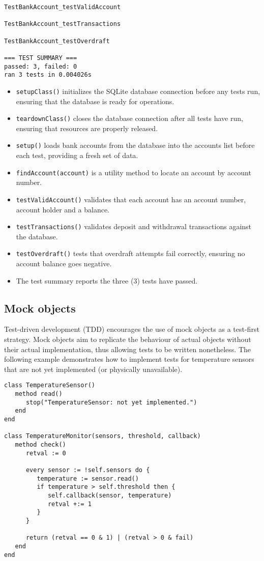 \documentclass[letterpaper,12pt]{article}
\begin{document}
\bigskip{}
\begin{verbatim}
TestBankAccount_testValidAccount

TestBankAccount_testTransactions

TestBankAccount_testOverdraft

=== TEST SUMMARY ===
passed: 3, failed: 0
ran 3 tests in 0.004026s
\end{verbatim}

\newpage{}
\begin{itemize}
   \item \texttt{setupClass()} initializes the SQLite database connection before any tests run, ensuring that the database is ready for operations.
   \item \texttt{teardownClass()} closes the database connection after all tests have run, ensuring that resources are properly released.
   \item \texttt{setup()} loads bank accounts from the database into the accounts list before each test, providing a fresh set of data.
   \item \texttt{findAccount(account)} is a utility method to locate an account by account number.
   \item \texttt{testValidAccount()} validates that each account has an account number, account holder and a balance.
   \item \texttt{testTransactions()} validates deposit and withdrawal transactions against the database.
   \item \texttt{testOverdraft()} tests that overdraft attempts fail correctly, ensuring no account balance goes negative.
   \item The test summary reports the three (3) tests have passed.
\end{itemize}

\newpage\subsection{Mock objects}

Test-driven development (TDD) encourages the use of mock objects as a test-first strategy. Mock objects aim to replicate the behaviour of actual objects without their actual implementation, thus allowing tests to be written nonetheless. The following example demonstrates how to implement tests for temperature sensors that are not yet implemented (or physically unavailable).

\bigskip{}
\begin{verbatim}
class TemperatureSensor()
   method read()
      stop("TemperatureSensor: not yet implemented.")
   end
end

class TemperatureMonitor(sensors, threshold, callback)
   method check()
      retval := 0

      every sensor := !self.sensors do {
         temperature := sensor.read()
         if temperature > self.threshold then {
            self.callback(sensor, temperature)
            retval +:= 1
         }
      }

      return (retval == 0 & 1) | (retval > 0 & fail)
   end
end
\end{verbatim}
\end{document}
